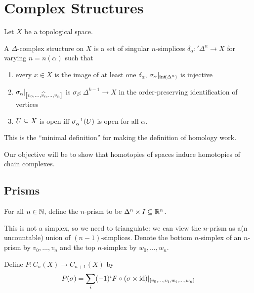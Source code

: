 \section{Complex Structures}

Let $X$ be a topological space.

\begin{boxdefinition}
    A $\Delta$-complex structure on $X$ is a set of singular $n$-simplices $\delta_{\alpha} : '\Delta^n \to X$ for varying $n = n(\alpha)$ such that
    \begin{enumerate}
        \item every $x \in X$ is the image of at least one $\delta_{\alpha}$, $\sigma_{\alpha} \vert_{\operatorname{int}\!\left( \Delta^n \right)}$ is injective
        \item $\sigma_{\alpha}\vert_{\left[ v_0, \ldots, \widehat{v_i}, \ldots, v_n \right]}$ is $\sigma_{\beta} : \Delta^{k-1} \to X$ in the order-preserving identification of vertices
        \item $U \subseteq X$ is open iff $\sigma_{\alpha}^{-1}\!\left( U \right)$ is open for all $\alpha$.
    \end{enumerate}
\end{boxdefinition}

This is the ``minimal definition'' for making the definition of homology work.

Our objective will be to show that homotopies of spaces induce homotopies of chain complexes.

\subsection{Prisms}

\begin{boxdefinition}[$n$-Prism]
    For all $n \in \mathbb{N}$, define the $n$-prism to be $\Delta^n \times I \subseteq \mathbb{R}^n$.
\end{boxdefinition}

This is not a simplex, so we need to triangulate: we can view the $n$-prism as a(n uncountable) union of $(n-1)$-simplices. Denote the bottom $n$-simplex of an $n$-prism by $v_0, \ldots, v_n$ and the top $n$-simplex by $w_0, \ldots, w_n$.

\begin{boxdefinition}
    Define $P : C_n(X) \to C_{n+1}(X)$ by
    \begin{align*}
        P(\sigma) = \sum_{i} (-1)^{i} F \circ (\sigma \times \operatorname{id}) \vert_{\left[ v_0, \ldots, v_i, w_i, \ldots, w_n \right]}
    \end{align*}
\end{boxdefinition}

